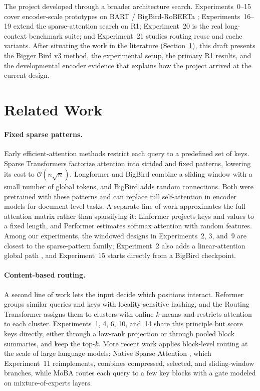 \documentclass[11pt]{article}
\newcommand{\bigO}{\mathcal{O}}
\begin{document}
The project developed through a broader architecture search. Experiments~0--15
cover encoder-scale prototypes on BART / BigBird-RoBERTa
\citep{zaheer2020bigbird}; Experiments~16--19 extend the sparse-attention
search on R1; Experiment~20 is the real long-context benchmark suite; and
Experiment~21 studies routing reuse and cache variants. After situating the work in the literature (Section~\ref{sec:related}),
this draft presents the Bigger Bird v3 method, the experimental setup, the
primary R1 results, and the developmental encoder evidence that explains how
the project arrived at the current design.

\section{Related Work}
\label{sec:related}

\paragraph{Fixed sparse patterns.}
Early efficient-attention methods restrict each query to a predefined set of
keys. Sparse Transformers \citep{child2019sparse} factorize attention into
strided and fixed patterns, lowering its cost to $\bigO(n\sqrt{n})$.
Longformer \citep{beltagy2020longformer} and BigBird \citep{zaheer2020bigbird}
combine a sliding window with a small number of global tokens, and BigBird
adds random connections. Both were pretrained with these patterns and can
replace full self-attention in encoder models for document-level tasks. A
separate line of work approximates the full attention matrix rather than
sparsifying it: Linformer \citep{wang2020linformer} projects keys and values
to a fixed length, and Performer \citep{choromanski2021performer} estimates
softmax attention with random features. Among our experiments, the windowed
designs in Experiments~2, 3, and~9 are closest to the sparse-pattern family;
Experiment~2 also adds a linear-attention global path
\citep{qin2024lightning}, and Experiment~15 starts directly from a BigBird
checkpoint.

\paragraph{Content-based routing.}
A second line of work lets the input decide which positions interact.
Reformer \citep{kitaev2020reformer} groups similar queries and keys with
locality-sensitive hashing, and the Routing Transformer
\citep{roy2021routing} assigns them to clusters with online $k$-means and
restricts attention to each cluster. Experiments~1, 4, 6, 10, and~14 share
this principle but score keys directly, either through a low-rank projection
or through pooled block summaries, and keep the top-$k$. More recent work
applies block-level routing at the scale of large language models: Native
Sparse Attention \citep{yuan2025nsa}, which Experiment~11 reimplements,
combines compressed, selected, and sliding-window branches, while MoBA
\citep{lu2025moba} routes each query to a few key blocks with a gate modeled
on mixture-of-experts layers.
\end{document}

